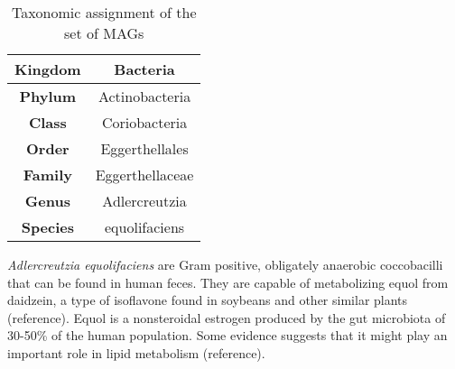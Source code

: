 \begin{table}[h]
\centering
\begin{tabular}{|c|c|}
    \hline
    \textbf{Kingdom} & Bacteria \\
    \hline
    \textbf{Phylum} & Actinobacteria \\
    \hline
    \textbf{Class} & Coriobacteria \\
    \hline
    \textbf{Order} & Eggerthellales \\
    \hline
    \textbf{Family} & Eggerthellaceae \\
    \hline
    \textbf{Genus} & Adlercreutzia \\
    \hline
    \textbf{Species} & equolifaciens \\
    \hline
\end{tabular}
\caption{Taxonomic assignment of the set of MAGs}
\label{tab:taxonomy}
\end{table}

\textit{Adlercreutzia equolifaciens} are Gram positive, obligately anaerobic coccobacilli that can be found in human feces. They are capable of metabolizing equol from daidzein, a type of isoflavone found in soybeans and other similar plants (reference). Equol is a nonsteroidal estrogen produced by the gut microbiota of 30-50\% of the human population. Some evidence suggests that it might play an important role in lipid metabolism (reference).